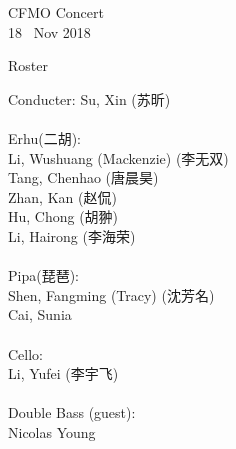 \documentclass[letter,6pt,poets]{ConcProg}
\begin{document}
\begin{programme}{
    CFMO Concert
\\  {\normalsize 18 ~Nov 2018}
}
\begin{part}[]
  \end{part}
  
  
\end{programme}
\begin{center}
Roster
\end{center}

\begin{multicols}{2}%


Conducter: Su, Xin  (苏昕)
\\
\\
 Erhu(二胡):                 \\
Li, Wushuang (Mackenzie) (李无双)   \\
Tang, Chenhao  (唐晨昊) \\
Zhan, Kan (赵侃)\\
Hu, Chong (胡翀)\\
Li, Hairong (李海荣)\\
\\
Pipa(琵琶):\\
Shen, Fangming (Tracy) (沈芳名)\\
Cai, Sunia\\

\\
Cello:\\
Li, Yufei (李宇飞)\\
\\
Double Bass (guest):\\
Nicolas Young\\
\\


\end{multicols}
\end{document}

